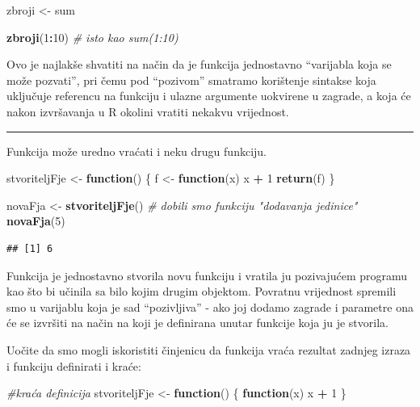 \documentclass[]{book}
\newenvironment{Shaded}{\begin{snugshade}}{\end{snugshade}}
\newcommand{\KeywordTok}[1]{\textcolor[rgb]{0.13,0.29,0.53}{\textbf{#1}}}
\newcommand{\DecValTok}[1]{\textcolor[rgb]{0.00,0.00,0.81}{#1}}
\newcommand{\StringTok}[1]{\textcolor[rgb]{0.31,0.60,0.02}{#1}}
\newcommand{\CommentTok}[1]{\textcolor[rgb]{0.56,0.35,0.01}{\textit{#1}}}
\newcommand{\ControlFlowTok}[1]{\textcolor[rgb]{0.13,0.29,0.53}{\textbf{#1}}}
\newcommand{\OperatorTok}[1]{\textcolor[rgb]{0.81,0.36,0.00}{\textbf{#1}}}
\newcommand{\NormalTok}[1]{#1}
\theoremstyle{definition}
\theoremstyle{definition}
\theoremstyle{definition}
\theoremstyle{remark}
\begin{document}
\begin{Shaded}
\begin{Highlighting}[]
\NormalTok{zbroji <-}\StringTok{ }\NormalTok{sum}

\KeywordTok{zbroji}\NormalTok{(}\DecValTok{1}\OperatorTok{:}\DecValTok{10}\NormalTok{)  }\CommentTok{# isto kao sum(1:10)}
\end{Highlighting}
\end{Shaded}

Ovo je najlakše shvatiti na način da je funkcija jednostavno ``varijabla
koja se može pozvati'', pri čemu pod ``pozivom'' smatramo korištenje
sintakse koja uključuje referencu na funkciju i ulazne argumente
uokvirene u zagrade, a koja će nakon izvršavanja u R okolini vratiti
nekakvu vrijednost.

\begin{center}\rule{0.5\linewidth}{\linethickness}\end{center}

Funkcija može uredno vraćati i neku drugu funkciju.

\begin{Shaded}
\begin{Highlighting}[]
\NormalTok{stvoriteljFje <-}\StringTok{ }\ControlFlowTok{function}\NormalTok{() \{}
\NormalTok{    f <-}\StringTok{ }\ControlFlowTok{function}\NormalTok{(x) x }\OperatorTok{+}\StringTok{ }\DecValTok{1}
    \KeywordTok{return}\NormalTok{(f)}
\NormalTok{\}}

\NormalTok{novaFja <-}\StringTok{ }\KeywordTok{stvoriteljFje}\NormalTok{() }\CommentTok{# dobili smo funkciju "dodavanja jedinice"}
\KeywordTok{novaFja}\NormalTok{(}\DecValTok{5}\NormalTok{)  }
\end{Highlighting}
\end{Shaded}

\begin{verbatim}
## [1] 6
\end{verbatim}

Funkcija je jednostavno stvorila novu funkciju i vratila ju pozivajućem
programu kao što bi učinila sa bilo kojim drugim objektom. Povratnu
vrijednost spremili smo u varijablu koja je sad ``pozivljiva'' - ako joj
dodamo zagrade i parametre ona će se izvršiti na način na koji je
definirana unutar funkcije koja ju je stvorila.

Uočite da smo mogli iskoristiti činjenicu da funkcija vraća rezultat
zadnjeg izraza i funkciju definirati i kraće:

\begin{Shaded}
\begin{Highlighting}[]
\CommentTok{#kraća definicija}
\NormalTok{stvoriteljFje <-}\StringTok{ }\ControlFlowTok{function}\NormalTok{() \{}
    \ControlFlowTok{function}\NormalTok{(x) x }\OperatorTok{+}\StringTok{ }\DecValTok{1}
\NormalTok{\}}
\end{Highlighting}
\end{Shaded}
\end{document}
